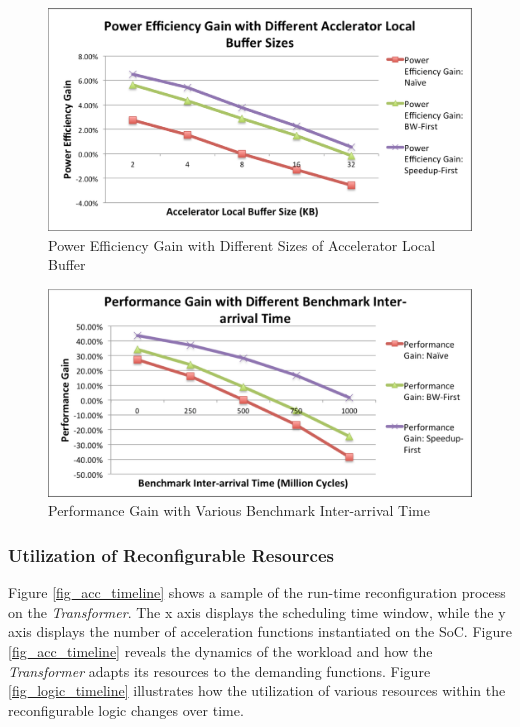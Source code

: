 \begin{figure}
    \centering
    \includegraphics[width=4.5in]{Acc-Buffer-Power}
    \caption{Power Efficiency Gain with Different Sizes of Accelerator Local Buffer}
    \label{fig_acc_buffer_power}
\end{figure}

\begin{figure}
    \centering
    \includegraphics[width=4.5in]{Benchmark-Switching-Time}
    \caption{Performance Gain with Various Benchmark Inter-arrival Time}
    \label{fig_benchmark-switching}
\end{figure}

\subsubsection{Utilization of Reconfigurable Resources}

Figure \ref{fig_acc_timeline} shows a sample of the run-time
reconfiguration process on the {\em Transformer}. The x axis displays the
scheduling time window, while the y axis displays the number of acceleration
functions instantiated on the SoC. Figure \ref{fig_acc_timeline}
reveals the dynamics of the workload and how the {\em Transformer} adapts its
resources to the demanding functions. Figure \ref{fig_logic_timeline}
illustrates how the utilization of various resources within the
reconfigurable logic changes over time.

